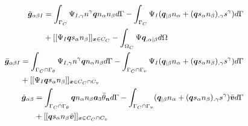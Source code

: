 \begin{subequations}
\begin{align}
\small
\begin{split}
\tilde{\boldsymbol g}_{\alpha\beta I} &= \int_{\Gamma_C} \Psi_{I,\gamma}n^\gamma \boldsymbol q n_\alpha n_\beta d\Gamma 
- \int_{\Gamma_C} \Psi_I(\boldsymbol q_{\vert \beta} n_\alpha + (\boldsymbol q s_\alpha n_\beta)_{,\gamma}s^\gamma) d\Gamma \\
&+ [[\Psi_I \boldsymbol q s_\alpha n_\beta]]_{\boldsymbol x\in C_C}
- \int_{\Omega_C} \Psi \boldsymbol q_{,\alpha\vert \beta} d\Omega \\
\end{split} \\
\small
\begin{split}
\bar{\boldsymbol g}_{\alpha\beta I} &= \int_{\Gamma_C\cap\Gamma_\theta} \Psi_{I,\gamma}n^\gamma \boldsymbol q n_\alpha n_\beta d\Gamma 
- \int_{\Gamma_C\cap\Gamma_v} \Psi_I(\boldsymbol q_{\vert \beta} n_\alpha + (\boldsymbol q s_\alpha n_\beta)_{,\gamma}s^\gamma) d\Gamma \\
&+ [[\Psi_I \boldsymbol q s_\alpha n_\beta]]_{\boldsymbol x\in C_C\cap C_v}
\end{split} \\
\small
\begin{split}
\hat{\boldsymbol g}_{\alpha\beta} &= \int_{\Gamma_C\cap\Gamma_\theta} \boldsymbol q n_\alpha n_\beta \boldsymbol a_3 \bar{\theta}_{\boldsymbol n} d\Gamma 
- \int_{\Gamma_C\cap\Gamma_v}(\boldsymbol q_{\vert \beta} n_\alpha + (\boldsymbol q s_\alpha n_\beta)_{,\gamma}s^\gamma)\bar{\boldsymbol v} d\Gamma \\
&+ [[\boldsymbol q s_\alpha n_\beta \bar{\boldsymbol v}]]_{\boldsymbol x\in C_C\cap C_v}
\end{split}
\end{align}
\end{subequations}
